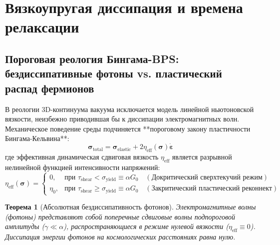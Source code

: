 \documentclass[12pt,a4paper]{article}
\newtheorem{theorem}{Теорема}
\begin{document}
	\section{Вязкоупругая диссипация и времена релаксации}
	
	\subsection{Пороговая реология Бингама-BPS: бездиссипативные фотоны vs. пластический распад фермионов}
	
	В реологии 3D-континуума вакуума исключается модель линейной ньютоновской вязкости, неизбежно приводившая бы к диссипации электромагнитных волн. Механическое поведение среды подчиняется **пороговому закону пластичности Бингама-Кельвина**:
	\begin{equation}
		\boldsymbol{\sigma}_{\text{total}} = \boldsymbol{\sigma}_{\text{elastic}} + 2 \eta_{\text{eff}}(\boldsymbol{\sigma}) \dot{\boldsymbol{\varepsilon}}
	\end{equation}
	где эффективная динамическая сдвиговая вязкость $\eta_{\text{eff}}$ является разрывной нелинейной функцией интенсивности напряжений:
	\begin{equation}
		\eta_{\text{eff}}(\boldsymbol{\sigma}) = \begin{cases} 
			0, & \text{при } \tau_{\text{shear}} < \sigma_{\text{yield}} \equiv \alpha G_0 \quad (\text{Докритический сверхтекучий режим}) \\
			\eta_0, & \text{при } \tau_{\text{shear}} \ge \sigma_{\text{yield}} \equiv \alpha G_0 \quad (\text{Закритический пластический реконнект})
		\end{cases}
	\end{equation}
	
	\begin{theorem}[Абсолютная бездиссипативность фотонов]
		Электромагнитные волны (фотоны) представляют собой поперечные сдвиговые волны подпороговой амплитуды ($\gamma \ll \alpha$), распространяющиеся в режиме нулевой вязкости ($\eta_{\mathrm{eff}} \equiv 0$). Диссипация энергии фотонов на космологических расстояниях равна нулю.
	\end{theorem}
	
\end{document}
